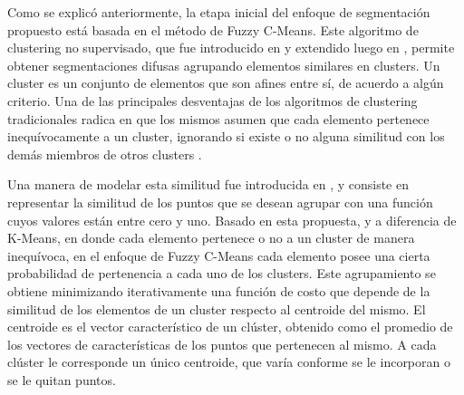 \label{fuzzy:Introduccion}

Como se explicó anteriormente, la etapa inicial del enfoque de segmentación propuesto está basada en el método de Fuzzy C-Means. Este algoritmo de clustering no supervisado, que fue introducido en \citep{dunn1973fuzzy} y extendido luego en \citep{bezdek1984fcm}, permite obtener segmentaciones difusas agrupando elementos similares en clusters. Un cluster es un conjunto de elementos que son afines entre sí, de acuerdo a algún criterio. Una de las principales desventajas de los algoritmos de clustering tradicionales radica en que los mismos asumen que cada elemento pertenece inequívocamente a un cluster, ignorando si existe o no alguna similitud con los demás miembros de otros clusters \citep{full1982fuzzy}.
 
Una manera de modelar esta similitud fue introducida en \citep{zadeh1965fuzzy}, y consiste en representar la similitud de los puntos que se desean agrupar con una función cuyos valores están entre cero y uno. Basado en esta propuesta, y a diferencia de K-Means, en donde cada elemento pertenece o no a un cluster de manera inequívoca, en el enfoque de Fuzzy C-Means cada elemento posee una cierta probabilidad de pertenencia a cada uno de los clusters. Este agrupamiento se obtiene minimizando iterativamente una función de costo que depende de la similitud de los elementos de un cluster respecto al centroide del mismo. El centroide es el vector característico de un clúster, obtenido como el promedio de los vectores de características de los puntos que pertenecen al mismo. A cada clúster le corresponde un único centroide, que varía conforme se le incorporan o se le quitan puntos.


